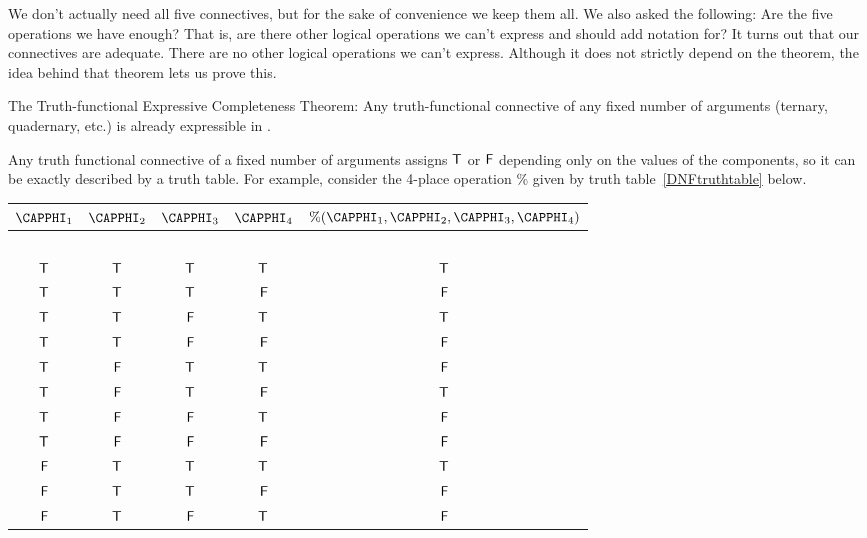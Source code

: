 \noindent{}We don't actually need all five connectives, but for the sake of convenience we keep them all.  We also asked the following: 
Are the five operations we have enough? 
That is, are there other logical operations we can't express and should add notation for? 
It turns out that our connectives are adequate. 
There are no other logical operations we can't express.
Although it does not strictly depend on the  theorem, the idea behind that theorem lets us prove this.
\begin{THEOREM}{ The Truth-functional Expressive Completeness Theorem:}
Any truth-functional connective of any fixed number of arguments (ternary, quadernary, etc.) is already expressible in \GSL{}.
\end{THEOREM}
\begin{PROOF}
Any truth functional connective of a fixed number of arguments assigns $\mathsf{T}$ or $\mathsf{F}$ depending only on the values of the components, so it can be exactly described by a truth table. 
For example, consider the 4-place operation \% given by truth \mbox{table \ref{DNFtruthtable}} below.
\begin{table}[!ht]
\begin{center}
\begin{tabular}{ c c c c c}
$\CAPPHI_1$ & $\CAPPHI_2$ & $\CAPPHI_3$ & $\CAPPHI_4$ & $\text{\%}(\CAPPHI_1,\CAPPHI_2,\CAPPHI_3,\CAPPHI_4)$ \\
\hline
$ $ $ $ \\[-.25cm]
$\mathsf{T}$ & $\mathsf{T}$ & $\mathsf{T}$ & $\mathsf{T}$ & $\mathsf{T}$ \\
$\mathsf{T}$ & $\mathsf{T}$ & $\mathsf{T}$ & $\mathsf{F}$&$\mathsf{F}$ \\
$\mathsf{T}$ & $\mathsf{T}$ & $\mathsf{F}$ & $\mathsf{T}$ & $\mathsf{T}$ \\
$\mathsf{T}$ & $\mathsf{T}$ & $\mathsf{F}$ & $\mathsf{F}$  &$\mathsf{F}$ \\
$\mathsf{T}$ &  $\mathsf{F}$& $\mathsf{T}$ & $\mathsf{T}$	&$\mathsf{F}$ \\
$\mathsf{T}$ & $\mathsf{F}$ & $\mathsf{T}$ & $\mathsf{F}$	& $\mathsf{T}$ \\
$\mathsf{T}$ &$\mathsf{F}$  & $\mathsf{F}$& $\mathsf{T}$	&$\mathsf{F}$ \\
$\mathsf{T}$ & $\mathsf{F}$ &$\mathsf{F}$	& $\mathsf{F}$	&$\mathsf{F}$ \\
$\mathsf{F}$	& $\mathsf{T}$ & $\mathsf{T}$ & $\mathsf{T}$	& $\mathsf{T}$ \\
$\mathsf{F}$	& $\mathsf{T}$ & $\mathsf{T}$ & $\mathsf{F}$	&$\mathsf{F}$ \\
$\mathsf{F}$	& $\mathsf{T}$ & $\mathsf{F}$&	$\mathsf{T}$ &$\mathsf{F}$ \\

\end{tabular}
\end{center}
\end{table}
\end{PROOF}

